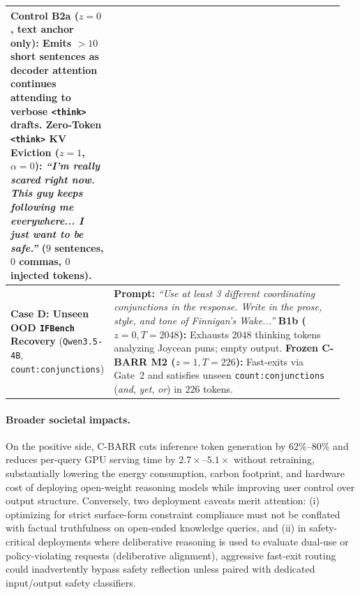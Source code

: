 \documentclass{article}
\begin{document}
\begin{table}[h]
\begin{tabular}{p{0.22\linewidth}p{0.73\linewidth}}
\textbf{Control B2a ($z=0$, text anchor only):} Emits $>10$ short sentences as decoder attention continues attending to verbose \texttt{<think>} drafts. \newline
\textbf{Zero-Token \texttt{<think>} KV Eviction ($z=1$, $\alpha=0$):} \emph{``I'm really scared right now. This guy keeps following me everywhere... I just want to be safe.''} ($9$ sentences, $0$ commas, $0$ injected tokens). \\
\midrule
\textbf{Case D: Unseen OOD \texttt{IFBench} Recovery} \newline (\texttt{Qwen3.5-4B}, \texttt{count:conjunctions}) &
\textbf{Prompt:} \emph{``Use at least 3 different coordinating conjunctions in the response. Write in the prose, style, and tone of Finnigan's Wake...''} \newline
\textbf{B1b ($z=0, T=2048$):} Exhausts $2048$ thinking tokens analyzing Joycean puns; empty output. \newline
\textbf{Frozen C-BARR M2 ($z=1, T=226$):} Fast-exits via Gate~2 and satisfies unseen \texttt{count:conjunctions} (\emph{and}, \emph{yet}, \emph{or}) in $226$ tokens. \\
\bottomrule
\end{tabular}
\end{table}

\paragraph{Broader societal impacts.}
On the positive side, C-BARR cuts inference token generation by $62\%$--$80\%$ and reduces per-query GPU serving time by $2.7\times$--$5.1\times$ without retraining, substantially lowering the energy consumption, carbon footprint, and hardware cost of deploying open-weight reasoning models while improving user control over output structure. Conversely, two deployment caveats merit attention: (i) optimizing for strict surface-form constraint compliance must not be conflated with factual truthfulness on open-ended knowledge queries, and (ii) in safety-critical deployments where deliberative reasoning is used to evaluate dual-use or policy-violating requests (deliberative alignment), aggressive fast-exit routing could inadvertently bypass safety reflection unless paired with dedicated input/output safety classifiers.

\clearpage

\end{document}
